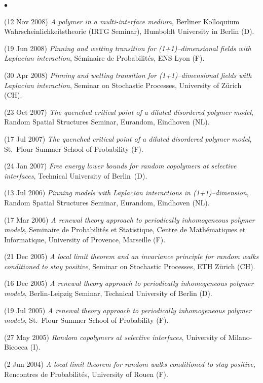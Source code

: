 \documentclass[a4paper,11pt,oneside]{amsart}
\newenvironment{myitemize}{%
\begin{list}{$\bullet$}%
 	{%
	\setlength{\itemsep}{0.3em}%
	\setlength{\topsep}{0.3em}%
	\setlength{\partopsep}{0em}%
	\setlength{\parsep}{0em}%
	\setlength{\parskip}{0em}%
	\setlength\leftmargin{1.5em}%
	\setlength\labelwidth{1.1em}%
	\setlength{\labelsep}{0.4em}%
	}%
	}%
{\end{list}}
\renewenvironment{itemize}{
\begin{myitemize}}%
{\end{myitemize}}
\begin{document}
\begin{itemize}
\item (12 Nov 2008)
\emph{A polymer in a multi-interface medium},
Berliner Kolloquium Wahr\-schein\-lich\-keits\-theo\-rie
(IRTG Seminar), Humboldt University in Berlin (D).

\item (19 Jun 2008)
\emph{Pinning and wetting transition for
(1+1)--dimensional fields with Laplacian interaction},
S\'eminaire de Probabilit\'es, ENS Lyon (F).

\item (30 Apr 2008)
\emph{Pinning and wetting transition for
(1+1)--dimensional fields with Laplacian interaction},
Seminar on Stochastic Processes, University of Z\"urich (CH).

\item (23 Oct 2007)
\emph{The quenched critical point of a diluted disordered polymer model},
Random Spatial Structures Seminar, Eurandom, Eindhoven (NL).

\item (17 Jul 2007)
\emph{The quenched critical point of a diluted disordered polymer model},
St.~Flour Summer School of Probability (F).

\item (24 Jan 2007)
\emph{Free energy lower bounds for random copolymers at selective interfaces},
Technical University of Berlin~(D).

\item (13 Jul 2006)
\emph{Pinning models with Laplacian interactions in (1+1)--dimension},
Random Spatial Structures Seminar, Eurandom, Eindhoven (NL).

\item (17 Mar 2006)
\emph{A renewal theory approach to periodically inhomogeneous polymer models},
Seminaire de Probabilit\'es et Statistique, Centre de Math\'ematiques et Informatique,
University of Provence, Marseille (F).

\item (21 Dec 2005)
\emph{A local limit theorem and an invariance principle for random walks conditioned
to stay positive},
Seminar on Stochastic Processes, ETH Z\"urich (CH).

\item (16 Dec 2005)
\emph{A renewal theory approach to periodically inhomogeneous polymer models},
Berlin-Leipzig Seminar, Technical University of Berlin (D).

\item (19 Jul 2005)
\emph{A renewal theory approach to periodically inhomogeneous polymer models},
St.~Flour Summer School of Probability (F).

\item (27 May 2005)
\emph{Random copolymers at selective interfaces},
University of Milano-Bicocca (I).

\item (2 Jun 2004)
\emph{A local limit theorem for random walks conditioned to stay positive},
Rencontres de Probabilit\'es,
University of Rouen (F).
\end{itemize}
\end{document}
